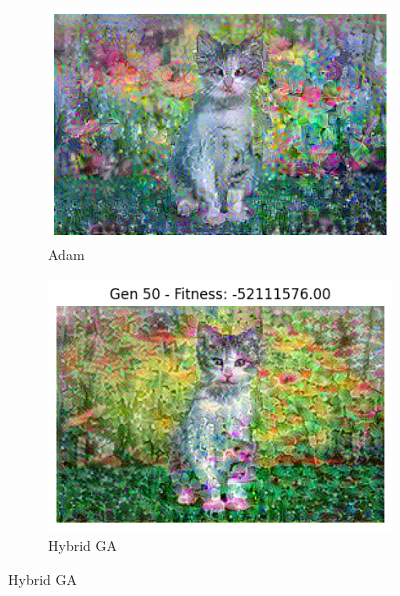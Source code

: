 \documentclass[a4paper,12pt]{article}
\begin{document}
\begin{figure}[H]
\begin{subfigure}{0.4\textwidth}
   
    \includegraphics[width=\linewidth]{cat_adam.png}
    \caption{Adam}
\end{subfigure}
\hfill
\begin{subfigure}{0.4\textwidth}
  
    \includegraphics[width=\linewidth]{cat_ga.png}
    \caption{Hybrid GA}
\end{subfigure}
\end{figure}
\end{document}
